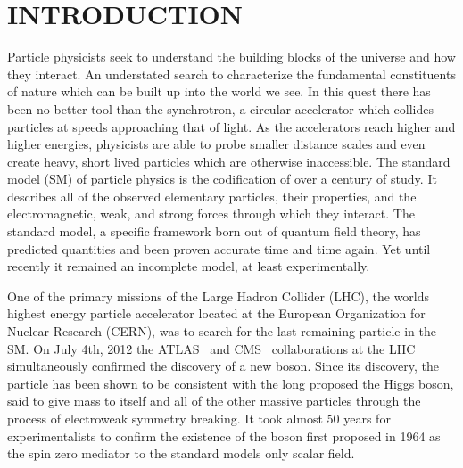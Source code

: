 %
%
%



\pagestyle{plain} %
\setcounter{page}{1}


\chapter{\uppercase {Introduction}}
\begin{comment}
1) Physics/colliders
2) Standard model
3) Higgs
4) This dissertation toppic
5) Organization
\end{comment}

Particle physicists seek to understand the building blocks of the universe and how they interact.
An understated search to characterize the fundamental constituents of nature which can be built up into the world we see.
In this quest there has been no better tool than the synchrotron, a circular accelerator which collides particles at speeds approaching that of light.
As the accelerators reach higher and higher energies, physicists are able to probe smaller distance scales and even create heavy, short lived particles which are otherwise inaccessible.
The standard model (SM) of particle physics is the codification of over a century of study.
It describes all of the observed elementary particles, their properties, and the electromagnetic, weak, and strong forces through which they interact.
The standard model, a specific framework born out of quantum field theory, has predicted quantities and been proven accurate time and time again.
Yet until recently it remained an incomplete model, at least experimentally.

One of the primary missions of the Large Hadron Collider (LHC), the worlds highest energy particle accelerator located at the European Organization for Nuclear Research (CERN), was to search for the last remaining particle in the SM.
On July 4th, 2012 the ATLAS~\cite{20121} and CMS~\cite{201230} collaborations at the LHC simultaneously confirmed the discovery of a new boson.
Since its discovery, the particle has been shown to be consistent with the long proposed the Higgs boson, said to give mass to itself and all of the other massive particles through the process of electroweak symmetry breaking.
It took almost 50 years for experimentalists to confirm the existence of the boson first proposed in 1964 as the spin zero mediator to the standard models only scalar field.

